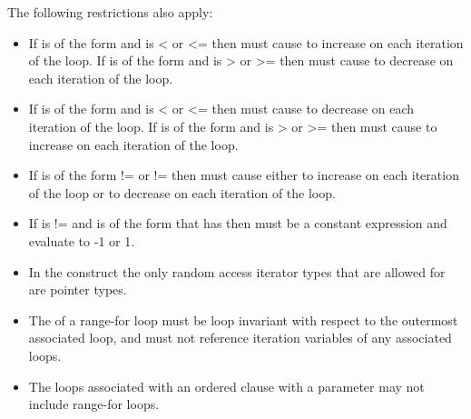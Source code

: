 \restrictions
The following restrictions also apply:

\begin{ccppspecific}
\begin{itemize}
\item If  is of the form  
       and  is < or <= then  
      must cause  to increase on each iteration of the loop. 
      If  is of the form   
       and  is > or >= then  
      must cause  to decrease on each iteration of the loop.
\item If  is of the form  
       and  is < or <= then  
      must cause  to decrease on each iteration of the loop. 
      If  is of the form   
       and  is > or >= then  
      must cause  to increase on each iteration of the loop.
\item If  is of the form  !=  or
       !=  then  must cause 
      either to increase on each iteration of the loop or to decrease on
      each iteration of the loop.
\item If  is != and  is of the
      form that has  then  must be a constant 
      expression and evaluate to -1 or 1.
\end{itemize}
\end{ccppspecific}

\begin{cppspecific}
\begin{itemize}
\item In the  construct the only random access iterator types
      that are allowed for  are pointer types.
\item The  of a range-for loop must be loop invariant
      with respect to the outermost associated loop, and must not reference
      iteration variables of any associated loops.
\item The loops associated with an ordered clause with a parameter may not
      include range-for loops.
\end{itemize}
\end{cppspecific}

